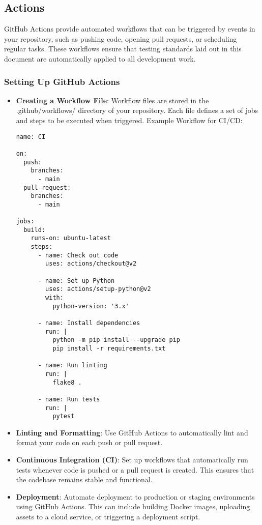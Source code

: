 \documentclass{ol-softwaremanual}
\begin{document}
\subsection{Actions}
GitHub Actions provide automated workflows that can be triggered by events in your repository, such as pushing code, opening pull requests, or scheduling regular tasks. These workflows ensure that testing standards laid out in this document are automatically applied to all development work.

\subsubsection{Setting Up GitHub Actions}
\begin{itemize}
    \item \textbf{Creating a Workflow File}: Workflow files are stored in the .github/workflows/ directory of your repository. Each file defines a set of jobs and steps to be executed when triggered. Example Workflow for CI/CD:
\begin{example}
\begin{verbatim}
name: CI

on:
  push:
    branches:
      - main
  pull_request:
    branches:
      - main

jobs:
  build:
    runs-on: ubuntu-latest
    steps:
      - name: Check out code
        uses: actions/checkout@v2
      
      - name: Set up Python
        uses: actions/setup-python@v2
        with:
          python-version: '3.x'
      
      - name: Install dependencies
        run: |
          python -m pip install --upgrade pip
          pip install -r requirements.txt

      - name: Run linting
        run: |
          flake8 .
      
      - name: Run tests
        run: |
          pytest
\end{verbatim}
\end{example}
\item \textbf{Linting and Formatting}: Use GitHub Actions to automatically lint and format your code on each push or pull request.
\item \textbf{Continuous Integration (CI)}: Set up workflows that automatically run tests whenever code is pushed or a pull request is created. This ensures that the codebase remains stable and functional.
\item \textbf{Deployment}: Automate deployment to production or staging environments using GitHub Actions. This can include building Docker images, uploading assets to a cloud service, or triggering a deployment script.
\end{itemize}
\end{document}
